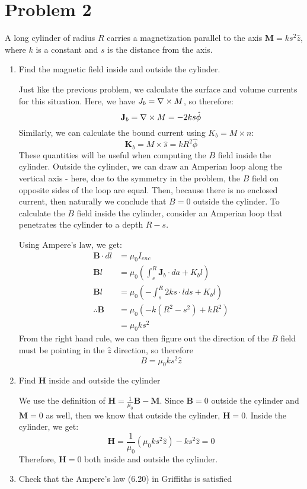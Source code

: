 \documentclass[10pt]{article}
\begin{document}
	\pagebreak
	\section*{Problem 2}
	A long cylinder of radius $R$ carries a magnetization parallel to the axis $\mathbf M = ks^2 \hat{z}$, where
	$k$ is a constant and $s$ is the distance from the axis. 
	\begin{enumerate}[label=\alph*)]
		\item Find the magnetic field inside and outside the cylinder.

			\begin{solution}
				Just like the previous problem, we calculate the surface and volume currents for this 
				situation. Here, we have $J_b = \nabla \times M$, so therefore:
				\[
				\mathbf J_b = \nabla \times M = -2ks \hat{\phi}
				\] 
				Similarly, we can calculate the bound current using $K_b = M \times n$:
				\[
				\mathbf K_b = M \times \hat{s} = kR^2 \hat{\phi}
				\] 
				These quantities will be
				useful when computing the $B$ field inside the cylinder. Outside the cylinder, we can draw an 
				Amperian loop along the vertical axis - here, due to the symmetry in the problem, the $B$ field
				on opposite sides of the loop are equal. Then, because there is no enclosed current, then 
				naturally we conclude that $B = 0$ outside the cylinder. To calculate the $B$ field inside the 
				cylinder, consider an Amperian loop that penetrates the cylinder to a depth $R - s$. 

				Using Ampere's law, we get: 
				\begin{align*}
					\mathbf B \cdot dl &= \mu_0 I_{enc}\\
					\mathbf Bl &= \mu_0\left(\int_s^R \mathbf J_b \cdot da + K_b l\right)\\
					\mathbf Bl &= \mu_0\left( -\int_s^R 2ks \cdot l ds + K_bl  \right) \\
					\therefore \mathbf B &= \mu_0\left( -k(R^2 - s^2) + kR^2 \right) \\
					&= \mu_0 ks^2 
				\end{align*}
				From the right hand rule, we can then figure out the direction of the $B$ field must be pointing
				in the $\hat{z}$ direction, so therefore
				\[
				B = \mu_0 ks^2 \hat{z}
				\] 
			\end{solution}
		\item Find $\mathbf H$ inside and outside the cylinder

			\begin{solution}
				We use the definition of $\mathbf H = \frac{1}{\mu_0}\mathbf B - \mathbf M$. Since $\mathbf B
				= 0$ outside the cylinder and $\mathbf M = 0$ as well, then we know that outside the cylinder, 
				$\mathbf H = 0$. Inside the cylinder, we get:
				\[
				\mathbf H = \frac{1}{\mu_0}(\mu_0 ks^2 \hat{z}) - ks^2 \hat{z} = 0
				\] 
				Therefore, $\mathbf H = 0$ both inside and outside the cylinder. 
			\end{solution}
		\item Check that the Ampere's law (6.20) in Griffiths is satisfied


\end{enumerate}
\end{document}
